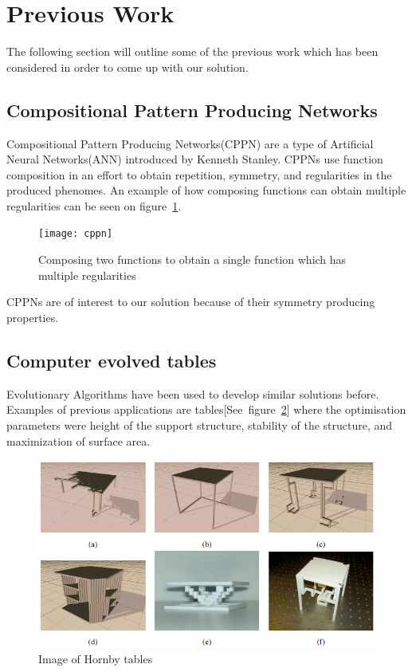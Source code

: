 \section{Previous Work}
The following section will outline some of the previous work which has been considered in order to come up with our solution.

\subsection{Compositional Pattern Producing Networks}
\label{sec:cppn}
Compositional Pattern Producing Networks(CPPN) are a type of Artificial Neural Networks(ANN) introduced by Kenneth Stanley\cite{Stanley2007}.
CPPNs use function composition in an effort to obtain repetition, symmetry, and regularities in the produced phenomes.
An example of how composing functions can obtain multiple regularities can be seen on figure~\ref{fig:cppn}.
\begin{figure}[ht]
\centering
\texttt{[image: cppn]}
\caption{Composing two functions to obtain a single function which has multiple regularities \cite{Stanley2007}}
\label{fig:cppn}
\end{figure}

CPPNs are of interest to our solution because of their symmetry producing properties.

\subsection{Computer evolved tables}
Evolutionary Algorithms have been used to develop similar solutions before. Examples of previous  applications are tables[See~figure~\ref{fig:hornby_tables}] where the optimisation parameters were height of the support structure, stability of the structure, and maximization of surface area.
\begin{figure}[ht]
\includegraphics[scale=.6]{content/img/tables}
\caption{Image of Hornby tables\cite{paper:ev4}}
\label{fig:hornby_tables}
\end{figure}

